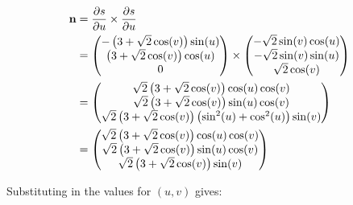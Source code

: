 \documentclass[10pt,\jkfside,a4paper]{article}
\begin{document}
\begin{enumerate}
\begin{enumerate}
\[
\begin{split}
\mathbf{n}
&= \pdv{s}{u} \times \pdv{s}{u} \\
&= \begin{pmatrix}
-\left(3 + \sqrt{2}\cos(v)\right)\sin(u)\\
\left(3 + \sqrt{2}\cos(v)\right)\cos(u)\\
0\\
\end{pmatrix}
\times
\begin{pmatrix}
-\sqrt{2}\sin(v)\cos(u)\\
-\sqrt{2}\sin(v)\sin(u)\\
\sqrt{2}\cos(v)\\
\end{pmatrix}\\
&=
\begin{pmatrix}
\sqrt{2}\left( 3 + \sqrt{2}\cos(v) \right)\cos(u)\cos(v)\\
\sqrt{2}\left( 3 + \sqrt{2}\cos(v) \right)\sin(u)\cos(v) \\
\sqrt{2}\left( 3 + \sqrt{2}\cos(v) \right)\left(\sin^2(u) + \cos^2(u)\right)
\sin(v) \\
\end{pmatrix}\\
&=
\begin{pmatrix}
\sqrt{2}\left( 3 + \sqrt{2}\cos(v) \right)\cos(u)\cos(v)\\
\sqrt{2}\left( 3 + \sqrt{2}\cos(v) \right)\sin(u)\cos(v) \\
\sqrt{2}\left( 3 + \sqrt{2}\cos(v) \right)\sin(v) \\
\end{pmatrix}\\
\end{split}
\]

Substituting in the values for $(u, v)$ gives:


\end{enumerate}
\end{enumerate}
\end{document}
